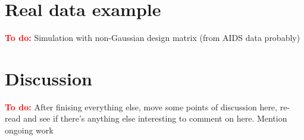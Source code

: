 \documentclass{imsart}
\newcommand{\minimize}{\mathop{\mathrm{minimize}}}
\newcommand{\todo}{\textcolor{red}{\textbf{To do: }}}
\newcommand{\real}{\mathbb{R}}
\begin{document}
\section{Real data example}
\todo Simulation with non-Gaussian design matrix (from AIDS data probably)



\section{Discussion}

\todo After finising everything else, move some points of discussion
here, re-read and see if there's anything else interesting to comment
on here. Mention ongoing work



%
%
%
%
\end{document}
